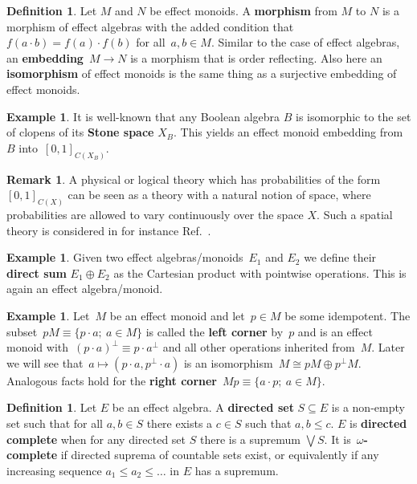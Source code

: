 \documentclass[10pt,conference]{IEEEtran}
\newcommand\Define[1]{\textbf{#1}}
\newcounter{counter}
\theoremstyle{definition}
\newtheorem{definition}[counter]{Definition}
\newtheorem{example}[counter]{Example}
\newtheorem{remark}[counter]{Remark}
\begin{document}
\begin{definition}
    Let $M$ and $N$ be effect monoids. A \Define{morphism} from $M$ to $N$ is
    a morphism of effect algebras with the added condition
    that~$f(a\cdot b) = f(a)\cdot f(b)$ for all~$a,b\in M$.
    Similar to the case of effect algebras,
        an \Define{embedding}~$M \to N$ is a morphism that is order reflecting.
    Also here an \Define{isomorphism} of effect monoids
        is the same thing as a surjective embedding of effect monoids.
\end{definition}

\begin{example}\label{ex:stone-embedding}
It is well-known that any Boolean algebra $B$
    is isomorphic to the set of clopens of
    its \Define{Stone space} $X_B$. This yields an effect monoid
    embedding from $B$ into~$[0,1]_{C(X_B)}$.
\end{example}

\begin{remark}
    A physical or logical theory which has probabilities of the form $[0,1]_{C(X)}$ can be seen as a theory with a natural notion of space, where probabilities are allowed to vary continuously over the space $X$. Such a spatial theory is considered in for instance Ref.~\cite{moliner2017space}.
\end{remark}

\begin{example}
    Given two effect algebras/monoids~$E_1$ and $E_2$ we define
    their \Define{direct sum} $E_1\oplus E_2$ as the Cartesian
    product with pointwise operations. This is again an effect
    algebra/monoid.
\end{example}

\begin{example}\label{cornersexample}
    Let~$M$ be an effect monoid and let~$p \in M$ be some idempotent.
    The subset~$pM \equiv \{p \cdot a; \ a\in M\}$
        is called the \Define{left corner} by~$p$
        and is an effect monoid with~$(p\cdot a)^\perp \equiv p \cdot a^\perp$
            and all other operations inherited from~$M$.
    Later we will see that~$a \mapsto (p\cdot a, p^\perp \cdot a)$
        is an isomorphism~$M \cong p M \oplus p^\perp M$.
Analogous facts hold for the \Define{right corner}~$Mp \equiv \{a \cdot p; \ a\in M\}$.
\end{example}

\begin{definition}
    Let $E$ be an effect algebra. A \Define{directed set} $S\subseteq
    E$ is a non-empty set such that for all $a,b\in S$ there exists a $c\in
    S$ such that $a,b\leq c$. $E$ is \Define{directed complete} when
    for any directed set $S$ there is a supremum $\bigvee S$.
    It is~\Define{$\omega$-complete}
        if directed suprema of countable sets exist, or equivalently if any increasing sequence $a_1\leq a_2\leq \ldots$ in $E$ has a supremum.
\end{definition}
\end{document}
